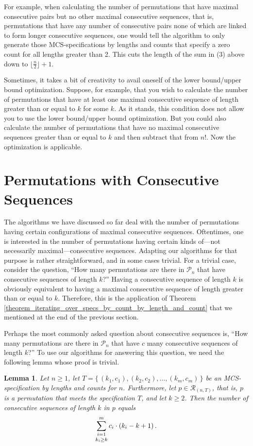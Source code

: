 \documentclass{article}
\newtheorem{lemma}[theorem]{Lemma}
\begin{document}
For example, when
calculating the number of permutations that have maximal consecutive pairs but no other maximal
consecutive sequences, that is, permutations that have any number of consecutive pairs none of
which are linked to form longer consecutive sequences, one would tell the algorithm
to only generate those MCS-specifications by lengths and counts that specify a zero count for all lengths
greater than 2. This cuts the length of the sum in (3) above down to $\lfloor\frac{n}{2}\rfloor + 1$. 

Sometimes, it takes a bit of creativity to avail oneself of the lower bound/upper bound optimization. Suppose,
for example, that you wish to calculate the number of permutations that have at least one maximal consecutive
sequence of length greater than or equal to $k$ for some $k$.
As it stands, this condition does not allow you to use the lower bound/upper bound optimization.
But you could also calculate the number of permutations that have no maximal consecutive sequences
greater than or equal to $k$ and then subtract that from $n!$. Now the optimization is applicable.

\section{Permutations with Consecutive Sequences}
The algorithms we have discussed so far deal with the number of permutations having certain configurations
of maximal consecutive sequences. Oftentimes, one is interested in the number of permutations having certain
kinds of---not necessarily maximal---consecutive sequences. Adapting our algorithms for that purpose is
rather straightforward, and in some cases trivial. For a trivial case, consider the question, ``How many
permutations are there in ${\mathcal P}_n$ that have consecutive sequences of length $k$?'' Having a
consecutive sequence of length $k$ is obviously equivalent to having a maximal consecutive sequence of
length greater than or equal to $k$. Therefore, this is the application of Theorem
\ref{theorem_iterating_over_specs_by_count_by_length_and_count} that we mentioned at the end of the
previous section.

Perhaps the most commonly asked question about consecutive sequences is, ``How many
permutations are there in ${\mathcal P}_n$ that have $c$ many consecutive sequences of length $k$?''
To use our algorithms for answering this question, we need the following lemma whose proof is trivial.

\begin{lemma}
  Let $n \geq 1$, let $T = \{\,(k_1, c_1), (k_2, c_2), \ldots,(k_m, c_m)\,\}$ be an
  MCS-specification by lengths and counts for $n$. Furthermore, let $p\in {\mathcal R}_{(n,T)}$,
  that is, $p$ is a permutation that meets the specification $T$, and let $k \geq 2$.
  Then the number of consecutive
  sequences of length $k$ in $p$ equals
  $$
  \sum_{\shortstack{$\scriptstyle i=1$\\$\scriptstyle k_i\geq k$}}^{m}c_i\cdot (k_i - k + 1)\,.
  $$
\end{lemma}
\end{document}
